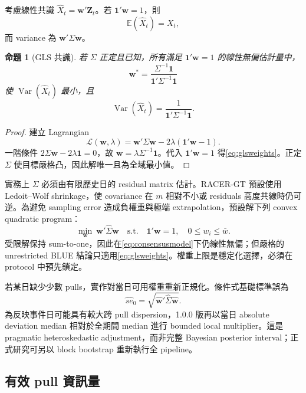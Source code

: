 \documentclass[12pt,a4paper,oneside]{article}
\newtheorem{proposition}{命題}[section]
\newcommand{\E}{\mathbb{E}}
\newcommand{\Var}{\operatorname{Var}}
\newcommand{\one}{\bm{1}}
\begin{document}
考慮線性共識 $\widehat X_t=\bm w'\bm Z_t$。若 $\one'\bm w=1$，則
\begin{equation}
\E(\widehat X_t)=X_t,
\end{equation}
而 variance 為 $\bm w'\Sigma\bm w$。

\begin{proposition}[GLS 共識]
若 $\Sigma$ 正定且已知，所有滿足 $\one'\bm w=1$ 的線性無偏估計量中，
\begin{equation}
\bm w^*=\frac{\Sigma^{-1}\one}{\one'\Sigma^{-1}\one}
\label{eq:glsweights}
\end{equation}
使 $\Var(\widehat X_t)$ 最小，且
\begin{equation}
\Var(\widehat X_t)=\frac{1}{\one'\Sigma^{-1}\one}.
\end{equation}
\end{proposition}

\begin{proof}
建立 Lagrangian
\[
\mathcal{L}(\bm w,\lambda)=\bm w'\Sigma\bm w-2\lambda(\one'\bm w-1).
\]
一階條件 $2\Sigma\bm w-2\lambda\one=0$，故 $\bm w=\lambda\Sigma^{-1}\one$。代入 $\one'\bm w=1$ 得\cref{eq:glsweights}。正定 $\Sigma$ 使目標嚴格凸，因此解唯一且為全域最小值。
\end{proof}

實務上 $\Sigma$ 必須由有限歷史日的 residual matrix 估計。RACER-GT 預設使用 Ledoit--Wolf shrinkage，使 covariance 在 $m$ 相對不小或 residuals 高度共線時仍可逆。為避免 sampling error 造成負權重與極端 extrapolation，預設解下列 convex quadratic program：
\begin{equation}
\min_{\bm w}\ \bm w'\widehat\Sigma\bm w
\quad\text{s.t.}\quad
\one'\bm w=1,\quad 0\le w_i\le \bar w.
\label{eq:constrainedweights}
\end{equation}
受限解保持 sum-to-one，因此在\cref{eq:consensusmodel}下仍線性無偏；但嚴格的 unrestricted BLUE 結論只適用\cref{eq:glsweights}。權重上限是穩定化選擇，必須在 protocol 中預先鎖定。

若某日缺少少數 pulls，實作對當日可用權重重新正規化。條件式基礎標準誤為
\begin{equation}
\widehat{se}_0=\sqrt{\widehat{\bm w}'\widehat\Sigma\widehat{\bm w}}.
\end{equation}
為反映事件日可能具有較大跨 pull dispersion，1.0.0 版再以當日 absolute deviation median 相對於全期間 median 進行 bounded local multiplier。這是 pragmatic heteroskedastic adjustment，而非完整 Bayesian posterior interval；正式研究可另以 block bootstrap 重新執行全 pipeline。

\subsection{有效 pull 資訊量}
\end{document}
